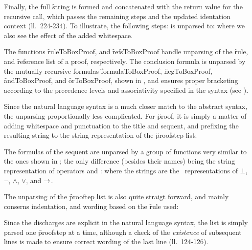 \documentclass[BA.tex]{subfiles}
\begin{document}
 Finally, the full \f{string} is formed and concatenated with the return
 value for the recursive call, which passes the remaining steps and the
 updated identation context (ll.~224-234).
 To illustrate, the following steps:
 is unparsed to:
where we also see the effect of the added whitespace.

The functions \f{ruleToBoxProof}, and \f{refsToBoxProof} handle unparsing
 of the \f{rule}, and \f{reference list} of a proof, respectively.
 The conclusion formula is unparsed by the mutually recursive formulas
 \f{formulaToBoxProof}, \f{negToBoxProof}, \f{andToBoxProof}, and
 \f{orToBoxProof}, shown in \lst{}, and ensures proper bracketing according
 to the precedence levels and associativity specified in the syntax
 (see ).
 


Since the natural language syntax is a much closer match to the abstract
 syntax, the unparsing proportionally less complicated. For \f{proof}, it
 is simply a matter of adding whitespace and punctuation to the title and 
 sequent, and prefixing the resulting string
 to the string representation of the \f{proofstep list}:
 
 The formulas of the sequent are unparsed by a group of functions very 
 similar to the ones shown in ; the only
 difference (besides their names) being the string representation of
 operators and \abs :
 where the strings are the \sml\ representations of \(\bot\), \(\neg\),
 \(\land\), \(\lor\), and \(\rightarrow\).
 
 The unparsing of the \f{prooftep list} is also quite straigt forward, and
 mainly conserns indentation, and wording based on the \f{rule} used:

 Since the discharges are explicit in the natural language syntax, the list
 is simply parsed one \f{proofstep} at a time, although a check of the
 \emph{existence} of subsequent lines is
 made to ensure correct wording of the last line (ll.~124-126).
\end{document}

